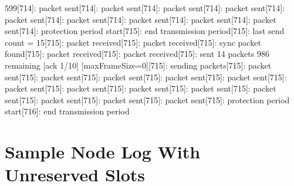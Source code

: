 \documentclass[parskip]{cs4rep}
\begin{document}
599[714]: packet sent[714]: packet sent[714]: packet sent[714]: packet sent[714]: packet sent[714]: packet sent[714]: packet sent[714]: packet sent[714]: packet sent[714]: protection period start[715]: end transmission period[715]: last send count = 15[715]: packet received[715]: packet received[715]: sync packet found[715]: packet received[715]: packet received[715]: sent 14 packets 986 remaining [ack 1/10] [maxFrameSize=0][715]: sending packets[715]: packet sent[715]: packet sent[715]: packet sent[715]: packet sent[715]: packet sent[715]: packet sent[715]: packet sent[715]: packet sent[715]: packet sent[715]: packet sent[715]: packet sent[715]: packet sent[715]: packet sent[715]: protection period start[716]: end transmission period\newline

\chapter{Sample Node Log With Unreserved Slots}
\end{document}
